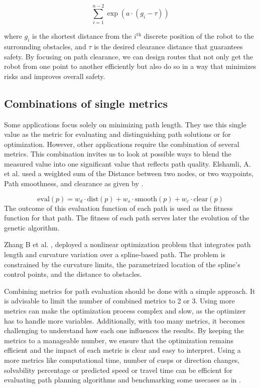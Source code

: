 \begin{equation}
    \sum_{i=1}^{n-2} \exp\left(a \cdot (g_i - \tau)\right)
    \label{clear}
\end{equation}

where \(g_i\) is the shortest distance from the \(i^{\text{th}}\) discrete position of the 
robot to the surrounding obstacles, and \(\tau\) is the desired clearance distance that 
guarantees safety. By focusing 
on path clearance, we can design routes that not only get the robot from one point to another efficiently 
but also do so in a way that minimizes risks and improves overall safety.

\subsection{Combinations of single metrics}

Some applications focus solely on minimizing path length. They use this single value as the 
metric for evaluating and distinguishing path solutions or for optimization. However, other 
applications require the combination of several metrics. This combination invites us to look 
at possible ways to blend the measured value into one significant value that reflects path quality.
Elshamli, A. et al. \cite{R17} used a weighted sum of the Distance between two nodes, or two waypoints,
Path smoothness, and clearance as given by . 

\begin{equation}
    \text{eval}(p) = w_d \cdot \text{dist}(p) + w_s \cdot \text{smooth}(p) + w_c \cdot \text{clear}(p)
    \label{evaluation}
\end{equation}
The outcome of this evaluation function of each path is used as the fitness function for that path.
The fitness of each path serves later the evolution of the genetic algorithm.

Zhang B et al. \cite{R36}, deployed a nonlinear optimization problem that integrates path length and 
curvature variation over a spline-based path. The problem is constrained by the curvature limits, the 
parametrized location of the spline's control points, and the distance to obstacles.

Combining metrics for path evaluation should be done with a simple approach. It is advisable to limit 
the number of combined metrics to 2 or 3. Using more metrics can make the optimization process complex 
and slow, as the optimizer has to handle more variables. Additionally, with too many metrics, it becomes 
challenging to understand how each one influences the results. By keeping the metrics to a 
manageable number, we ensure that the optimization remains efficient and the impact of each metric 
is clear and easy to interpret. 
Using a more metrics like computational time, number of cusps or direction changes, solvability percentage
or predicted speed or travel time can be efficient for evaluating path planning algorithms and benchmarking some
usecases as in \cite{R23}.

